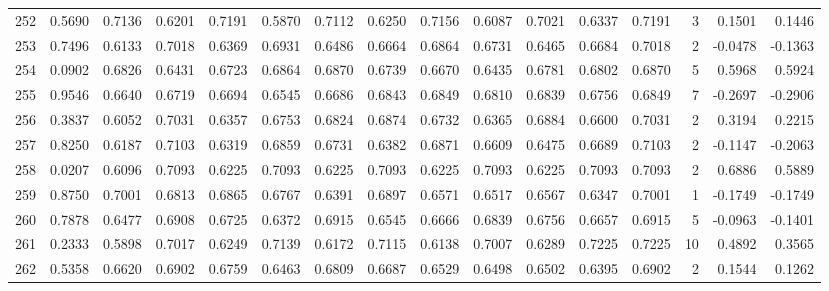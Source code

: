 \begin{tabular}{lrrrrrrrrrrrrrrr}
252 &      0.5690 &  0.7136 &  0.6201 &  0.7191 &  0.5870 &  0.7112 &  0.6250 &  0.7156 &  0.6087 &  0.7021 &   0.6337 &     0.7191 &      3 &                    0.1501 &                     0.1446 \\
253 &      0.7496 &  0.6133 &  0.7018 &  0.6369 &  0.6931 &  0.6486 &  0.6664 &  0.6864 &  0.6731 &  0.6465 &   0.6684 &     0.7018 &      2 &                   -0.0478 &                    -0.1363 \\
254 &      0.0902 &  0.6826 &  0.6431 &  0.6723 &  0.6864 &  0.6870 &  0.6739 &  0.6670 &  0.6435 &  0.6781 &   0.6802 &     0.6870 &      5 &                    0.5968 &                     0.5924 \\
255 &      0.9546 &  0.6640 &  0.6719 &  0.6694 &  0.6545 &  0.6686 &  0.6843 &  0.6849 &  0.6810 &  0.6839 &   0.6756 &     0.6849 &      7 &                   -0.2697 &                    -0.2906 \\
256 &      0.3837 &  0.6052 &  0.7031 &  0.6357 &  0.6753 &  0.6824 &  0.6874 &  0.6732 &  0.6365 &  0.6884 &   0.6600 &     0.7031 &      2 &                    0.3194 &                     0.2215 \\
257 &      0.8250 &  0.6187 &  0.7103 &  0.6319 &  0.6859 &  0.6731 &  0.6382 &  0.6871 &  0.6609 &  0.6475 &   0.6689 &     0.7103 &      2 &                   -0.1147 &                    -0.2063 \\
258 &      0.0207 &  0.6096 &  0.7093 &  0.6225 &  0.7093 &  0.6225 &  0.7093 &  0.6225 &  0.7093 &  0.6225 &   0.7093 &     0.7093 &      2 &                    0.6886 &                     0.5889 \\
259 &      0.8750 &  0.7001 &  0.6813 &  0.6865 &  0.6767 &  0.6391 &  0.6897 &  0.6571 &  0.6517 &  0.6567 &   0.6347 &     0.7001 &      1 &                   -0.1749 &                    -0.1749 \\
260 &      0.7878 &  0.6477 &  0.6908 &  0.6725 &  0.6372 &  0.6915 &  0.6545 &  0.6666 &  0.6839 &  0.6756 &   0.6657 &     0.6915 &      5 &                   -0.0963 &                    -0.1401 \\
261 &      0.2333 &  0.5898 &  0.7017 &  0.6249 &  0.7139 &  0.6172 &  0.7115 &  0.6138 &  0.7007 &  0.6289 &   0.7225 &     0.7225 &     10 &                    0.4892 &                     0.3565 \\
262 &      0.5358 &  0.6620 &  0.6902 &  0.6759 &  0.6463 &  0.6809 &  0.6687 &  0.6529 &  0.6498 &  0.6502 &   0.6395 &     0.6902 &      2 &                    0.1544 &                     0.1262 \\

\end{tabular}
